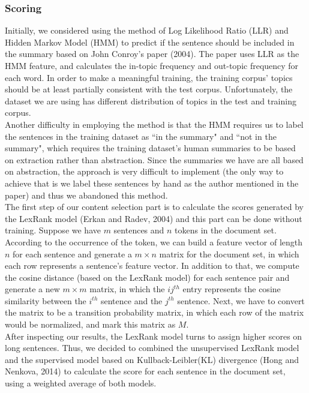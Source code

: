 \documentclass[11pt]{article}
\begin{document}
\subsubsection{Scoring}
Initially, we considered using the method of Log Likelihood Ratio (LLR) and Hidden Markov Model (HMM) to predict if the sentence should be included in the summary based on John Conroy's paper (2004). The paper uses LLR as the HMM feature, and calculates the in-topic frequency and out-topic frequency for each word. In order to make a meaningful training, the training corpus' topics should be at least partially consistent with the test corpus. Unfortunately, the dataset we are using has different distribution of topics in the test and training corpus. \\
\indent
Another difficulty in employing the method is that the HMM requires us to label the sentences in the training dataset as ``in the summary" and ``not in the summary", which requires the training dataset's human summaries to be based on extraction rather than abstraction. Since the summaries we have are all based on abstraction, the approach is very difficult to implement (the only way to achieve that is we label these sentences by hand as the author mentioned in the paper) and thus we abandoned this method. \\
\indent
The first step of our content selection part is to calculate the scores generated by the LexRank model (Erkan and Radev, 2004) and this part can be done without training. Suppose we have $m$ sentences and $n$ tokens in the document set. According to the occurrence of the token, we can build a feature vector of length $n$ for each sentence and generate a $m\times n$ matrix for the document set, in which each row represents a sentence's feature vector. In addition to that, we compute the cosine distance (based on the LexRank model) for each sentence pair and generate a new $m\times m$ matrix, in which the $ij^{th}$ entry represents the cosine similarity between the $i^{th}$ sentence and the $j^{th}$ sentence. Next, we have to convert the matrix to be a transition probability matrix, in which each row of the matrix would be normalized, and mark this matrix as $M$. \\
\indent
After inspecting our results, the LexRank model turns to assign higher scores on long sentences. Thus, we decided to combined the unsupervised LexRank model and the supervised model based on Kullback-Leibler(KL) divergence (Hong and Nenkova, 2014) to calculate the score for each sentence in the document set, using a weighted average of both models. \\
\end{document}
